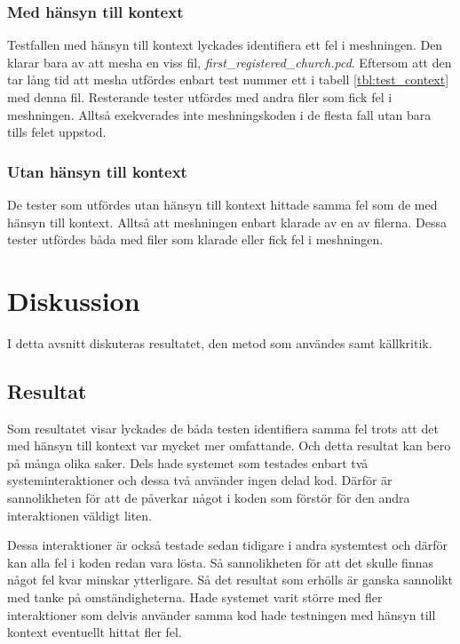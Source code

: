 \subsubsection{Med hänsyn till kontext}

Testfallen med hänsyn till kontext lyckades identifiera ett fel i meshningen. Den klarar bara av att mesha en viss fil, \textit{first\_registered\_church.pcd}. Eftersom att den tar lång tid att mesha utfördes enbart test nummer ett i tabell \ref{tbl:test_context} med denna fil. Resterande tester utfördes med andra filer som fick fel i meshningen. Alltså exekverades inte meshningskoden i de flesta fall utan bara tills felet uppstod.

\subsubsection{Utan hänsyn till kontext}

De tester som utfördes utan hänsyn till kontext hittade samma fel som de med hänsyn till kontext. Alltså att meshningen enbart klarade av en av filerna. Dessa tester utfördes båda med filer som klarade eller fick fel i meshningen.

\section{Diskussion}
\label{sec:discussion-holmberg}

I detta avsnitt diskuteras resultatet, den metod som användes samt källkritik.

\subsection{Resultat}

Som resultatet visar lyckades de båda testen identifiera samma fel trots att det med hänsyn till kontext var mycket mer omfattande. Och detta resultat kan bero på många olika saker. Dels hade systemet som testades enbart två systeminteraktioner och dessa två använder ingen delad kod. Därför är sannolikheten för att de påverkar något i koden som förstör för den andra interaktionen väldigt liten.

Dessa interaktioner är också testade sedan tidigare i andra systemtest och därför kan alla fel i koden redan vara lösta. Så sannolikheten för att det skulle finnas något fel kvar minskar ytterligare. Så det resultat som erhölls är ganska sannolikt med tanke på omständigheterna. Hade systemet varit större med fler interaktioner som delvis använder samma kod hade testningen med hänsyn till kontext eventuellt hittat fler fel.

